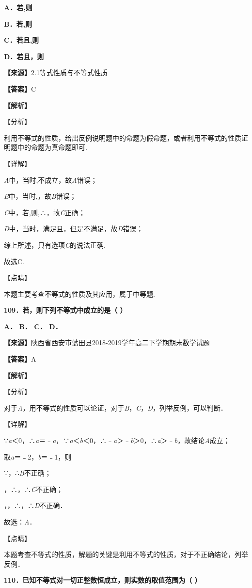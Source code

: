 \documentclass[
]{article}
\begin{document}
\textbf{A．若,则}

\textbf{B．若,则}

\textbf{C．若且,则}

\textbf{D．若且，则}

\textbf{【来源】}2.1等式性质与不等式性质

\textbf{【答案】}C

\textbf{【解析】}

【分析】

利用不等式的性质，给出反例说明题中的命题为假命题，或者利用不等式的性质证明题中的命题为真命题即可.

【详解】

\emph{A}中，当时,不成立，故\emph{A}错误；

\emph{B}中，当时,，故\emph{B}错误；

\emph{C}中，若,则,∴，故\emph{C}正确；

\emph{D}中，当时，满足且，但是不满足，故\emph{D}错误；

综上所述，只有选项\emph{C}的说法正确.

故选C.

【点睛】

本题主要考查不等式的性质及其应用，属于中等题.

\textbf{109．若，则下列不等式中成立的是（ ）}

\textbf{A． B． C． D．}

\textbf{【来源】}陕西省西安市蓝田县2018-2019学年高二下学期期末数学试题

\textbf{【答案】}A

\textbf{【解析】}

【分析】

对于\emph{A}，用不等式的性质可以论证，对于\emph{B}，\emph{C}，\emph{D}，列举反例，可以判断．

【详解】

∵\emph{a}＜0，∴\textbar{}\emph{a}\textbar＝﹣\emph{a}，∵\emph{a}＜\emph{b}＜0，∴﹣\emph{a}＞﹣\emph{b}＞0，∴\textbar{}\emph{a}\textbar＞﹣\emph{b}，故结论\emph{A}成立；

取\emph{a}＝﹣2，\emph{b}＝﹣1，则

∵，∴\emph{B}不正确；

，∴，∴\emph{C}不正确；

，，∴，∴\emph{D}不正确．

故选：\emph{A}．

【点睛】

本题考查不等式的性质，解题的关键是利用不等式的性质，对于不正确结论，列举反例．

\textbf{110．已知不等式对一切正整数恒成立，则实数的取值范围为（ ）}
\end{document}
